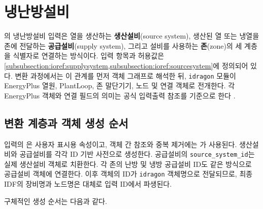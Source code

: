 
\section{냉난방설비}
\label{section:hvac-conversion}

\simulator 의 냉난방설비 입력은  열을 생산하는 \textbf{생산설비}(source system), 생산된 열 또는 냉열을 존에 전달하는 \textbf{공급설비}(supply system), 그리고 설비를 사용하는 \textbf{존}(zone)의 세 계층을 식별자로 연결하는 방식이다. 입력 항목과 허용값은 \cref{subsubsection:ioref:supplysystem,subsubsection:ioref:sourcesystem}에 정의되어 있다. 변환 과정에서는 이 관계를 먼저 \pymodule 객체 그래프로 해석한 뒤, \texttt{idragon} 모듈이 EnergyPlus 열원, PlantLoop, 존 말단기기, 노드 및 연결 객체로 전개한다. 각 EnergyPlus 객체와 연결 필드의 의미는 공식 입력출력 참조를 기준으로 한다 \cite{energyplusior242}.

\subsection{변환 계층과 객체 생성 순서}

입력의 은 사용자 표시용 속성이고, 객체 간 참조와 중복 제거에는 가 사용된다.  생산설비와 공급설비를 각각 ID 기반 사전으로 생성한다. 공급설비의 \texttt{source\_}\allowbreak\texttt{system\_}\allowbreak\texttt{id}는 실제 생산설비 객체로 치환한다. 각 존의 난방 및 냉방 공급설비 ID도 같은 방식으로 공급설비 객체에 연결한다. 이후 \pymodule 객체의 ID가 \texttt{idragon} 객체명으로 전달되므로, 최종 IDF의 장비명과 노드명은 대체로 입력 ID에서 파생된다.

구체적인 생성 순서는 다음과 같다.

